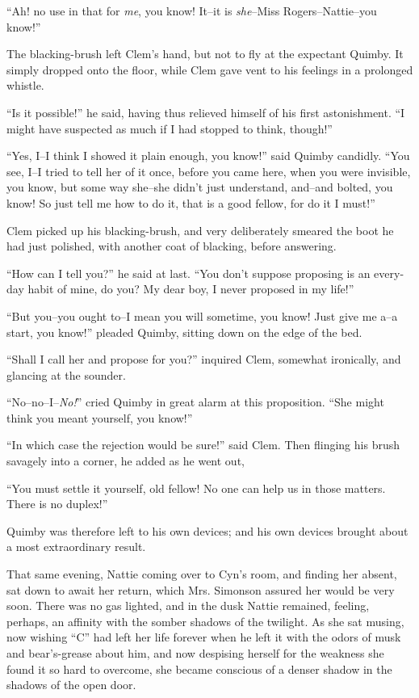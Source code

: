 ``Ah! no use in that for \emph{me}, you know! It--it is \emph{she}--Miss
Rogers--Nattie--you know!''

The blacking-brush left Clem's hand, but not to fly at the expectant
Quimby. It simply dropped onto the floor, while Clem gave vent to his
feelings in a prolonged whistle.

``Is it possible!'' he said, having thus relieved himself of his first
astonishment. ``I might have suspected as much if I had stopped to think,
though!''

``Yes, I--I think I showed it plain enough, you know!'' said Quimby
candidly. ``You see, I--I tried to tell her of it once, before you came
here, when you were invisible, you know, but some way she--she didn't
just understand, and--and bolted, you know! So just tell me how to do
it, that is a good fellow, for do it I must!''

Clem picked up his blacking-brush, and very deliberately smeared the
boot he had just polished, with another coat of blacking, before
answering.

``How can I tell you?'' he said at last. ``You don't suppose proposing is
an every-day habit of mine, do you? My dear boy, I never proposed in my
life!''

``But you--you ought to--I mean you will sometime, you know! Just give me
a--a start, you know!'' pleaded Quimby, sitting down on the edge of the
bed.

``Shall I call her and propose for you?'' inquired Clem, somewhat
ironically, and glancing at the sounder.

``No--no--I--\emph{No!}'' cried Quimby in great alarm at this proposition. ``She
might think you meant yourself, you know!''

``In which case the rejection would be sure!'' said Clem. Then flinging
his brush savagely into a corner, he added as he went out,

``You must settle it yourself, old fellow! No one can help us in those
matters. There is no duplex!''

Quimby was therefore left to his own devices; and his own devices
brought about a most extraordinary result.

That same evening, Nattie coming over to Cyn's room, and finding her
absent, sat down to await her return, which Mrs. Simonson assured her
would be very soon. There was no gas lighted, and in the dusk Nattie
remained, feeling, perhaps, an affinity with the somber shadows of the
twilight. As she sat musing, now wishing ``C'' had left her life forever
when he left it with the odors of musk and bear's-grease about him, and
now despising herself for the weakness she found it so hard to overcome,
she became conscious of a denser shadow in the shadows of the open door.


